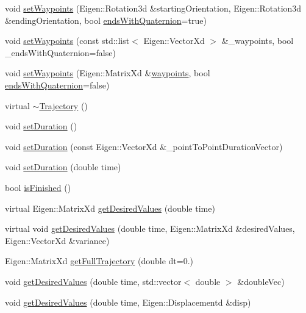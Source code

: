 \begin{DoxyCompactItemize}
\item 
void \hyperlink{classocra_1_1Trajectory_ad787da3056374594ce65df54795deae8}{set\+Waypoints} (Eigen\+::\+Rotation3d \&starting\+Orientation, Eigen\+::\+Rotation3d \&ending\+Orientation, bool \hyperlink{classocra_1_1Trajectory_a4f230978860de9473f83df3b8ae31ad9}{ends\+With\+Quaternion}=true)
\item 
void \hyperlink{classocra_1_1Trajectory_a24754dba11643737f02be0bd7c16023e}{set\+Waypoints} (const std\+::list$<$ Eigen\+::\+Vector\+Xd $>$ \&\+\_\+waypoints, bool \+\_\+ends\+With\+Quaternion=false)
\item 
void \hyperlink{classocra_1_1Trajectory_adde90667693b2648420917e80a39d1e6}{set\+Waypoints} (Eigen\+::\+Matrix\+Xd \&\hyperlink{classocra_1_1Trajectory_ab0514f8c3c8d4827b19dc863ff800b43}{waypoints}, bool \hyperlink{classocra_1_1Trajectory_a4f230978860de9473f83df3b8ae31ad9}{ends\+With\+Quaternion}=false)
\item 
virtual \hyperlink{classocra_1_1Trajectory_aede5bc277bdb4aff286b68c1d7a5d9be}{$\sim$\+Trajectory} ()
\item 
void \hyperlink{classocra_1_1Trajectory_a4e0a8295e1b8eb74cd13f130e5ab1475}{set\+Duration} ()
\item 
void \hyperlink{classocra_1_1Trajectory_ad4c3f94e32faff36aa25e2acb66e4bb5}{set\+Duration} (const Eigen\+::\+Vector\+Xd \&\+\_\+point\+To\+Point\+Duration\+Vector)
\item 
void \hyperlink{classocra_1_1Trajectory_abc96649d0b4431608ceb524f9db3b73b}{set\+Duration} (double time)
\item 
bool \hyperlink{classocra_1_1Trajectory_a1d6839b9239d113f6992e84a9cc711d6}{is\+Finished} ()
\item 
virtual Eigen\+::\+Matrix\+Xd \hyperlink{classocra_1_1Trajectory_a2102a829e6dad497f7c773c346d499b7}{get\+Desired\+Values} (double time)
\item 
virtual void \hyperlink{classocra_1_1Trajectory_aab6869cf5bc4a7c44eac36a0e49255b9}{get\+Desired\+Values} (double time, Eigen\+::\+Matrix\+Xd \&desired\+Values, Eigen\+::\+Vector\+Xd \&variance)
\item 
Eigen\+::\+Matrix\+Xd \hyperlink{classocra_1_1Trajectory_a87385335b84eaebd6ec4e757198e6f7b}{get\+Full\+Trajectory} (double dt=0.)
\item 
void \hyperlink{classocra_1_1Trajectory_a195921776ed3d3b403dcb8728ee8d02a}{get\+Desired\+Values} (double time, std\+::vector$<$ double $>$ \&double\+Vec)
\item 
void \hyperlink{classocra_1_1Trajectory_a5e9026bd9eb9a50f820fd561d7783c59}{get\+Desired\+Values} (double time, Eigen\+::\+Displacementd \&disp)

\end{DoxyCompactItemize}
